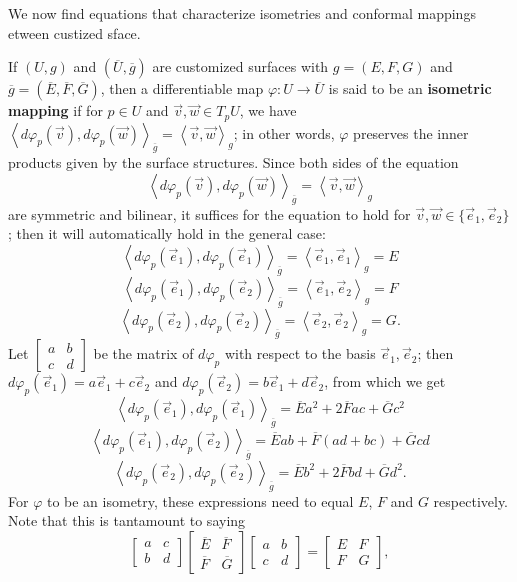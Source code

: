\documentclass[leqno]{book}
\begin{document}
\noindent We now find equations that characterize isometries and conformal mappings etween custized sface.

If $(U,g)$ and $(\overline U,\overline g)$ are customized surfaces with $g=(E,F,G)$ and $\overline g=(\overline E,\overline F,\overline G)$, then a differentiable map $\varphi:U\to\overline U$ is said to be an \textbf{isometric mapping} if for $p\in U$ and $\vec v,\vec w\in T_pU$, we have $\left<d\varphi_p(\vec v),d\varphi_p(\vec w)\right>_{\overline g}=\left<\vec v,\vec w\right>_g$; in other words, $\varphi$ preserves the inner products given by the surface structures.  Since both sides of the equation %
$$\left<d\varphi_p(\vec v),d\varphi_p(\vec w)\right>_{\overline g}=\left<\vec v,\vec w\right>_g$$
are symmetric and bilinear, it suffices for the equation to hold for $\vec v,\vec w\in\{\vec e_1,\vec e_2\}$; then it will automatically hold in the general case:
$$\left<d\varphi_p(\vec e_1),d\varphi_p(\vec e_1)\right>_{\overline g}=\left<\vec e_1,\vec e_1\right>_g=E$$
$$\left<d\varphi_p(\vec e_1),d\varphi_p(\vec e_2)\right>_{\overline g}=\left<\vec e_1,\vec e_2\right>_g=F$$
$$\left<d\varphi_p(\vec e_2),d\varphi_p(\vec e_2)\right>_{\overline g}=\left<\vec e_2,\vec e_2\right>_g=G.$$
Let $\begin{bmatrix}a&b\\c&d\end{bmatrix}$ be the matrix of $d\varphi_p$ with respect to the basis $\vec e_1,\vec e_2$; then $d\varphi_p(\vec e_1)=a\vec e_1+c\vec e_2$ and $d\varphi_p(\vec e_2)=b\vec e_1+d\vec e_2$, from which we get
$$\left<d\varphi_p(\vec e_1),d\varphi_p(\vec e_1)\right>_{\overline g}=\overline Ea^2+2\overline Fac+\overline Gc^2$$
$$\left<d\varphi_p(\vec e_1),d\varphi_p(\vec e_2)\right>_{\overline g}=\overline Eab+\overline F(ad+bc)+\overline Gcd$$
$$\left<d\varphi_p(\vec e_2),d\varphi_p(\vec e_2)\right>_{\overline g}=\overline Eb^2+2\overline Fbd+\overline Gd^2.$$
For $\varphi$ to be an isometry, these expressions need to equal $E$, $F$ and $G$ respectively.  Note that this is tantamount to saying
$$\begin{bmatrix}a&c\\b&d\end{bmatrix}\begin{bmatrix}\overline E&\overline F\\\overline F&\overline G\end{bmatrix}\begin{bmatrix}a&b\\c&d\end{bmatrix}=\begin{bmatrix}E&F\\F&G\end{bmatrix},$$
\end{document}
